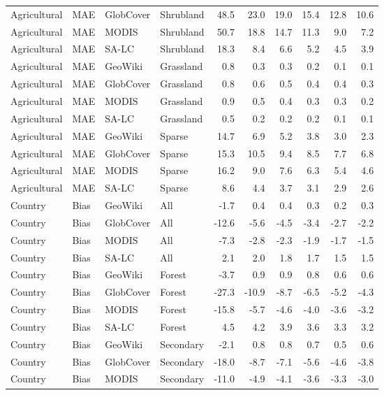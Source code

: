 \begin{longtable}{llllrrrrrr}
  Agricultural & MAE & GlobCover & Shrubland & 48.5 & 23.0 & 19.0 & 15.4 & 12.8 & 10.6 \\ 
  Agricultural & MAE & MODIS & Shrubland & 50.7 & 18.8 & 14.7 & 11.3 & 9.0 & 7.2 \\ 
  Agricultural & MAE & SA-LC & Shrubland & 18.3 & 8.4 & 6.6 & 5.2 & 4.5 & 3.9 \\ 
  Agricultural & MAE & GeoWiki & Grassland & 0.8 & 0.3 & 0.3 & 0.2 & 0.1 & 0.1 \\ 
  Agricultural & MAE & GlobCover & Grassland & 0.8 & 0.6 & 0.5 & 0.4 & 0.4 & 0.3 \\ 
  Agricultural & MAE & MODIS & Grassland & 0.9 & 0.5 & 0.4 & 0.3 & 0.3 & 0.2 \\ 
  Agricultural & MAE & SA-LC & Grassland & 0.5 & 0.2 & 0.2 & 0.2 & 0.1 & 0.1 \\ 
  Agricultural & MAE & GeoWiki & Sparse & 14.7 & 6.9 & 5.2 & 3.8 & 3.0 & 2.3 \\ 
  Agricultural & MAE & GlobCover & Sparse & 15.3 & 10.5 & 9.4 & 8.5 & 7.7 & 6.8 \\ 
  Agricultural & MAE & MODIS & Sparse & 16.2 & 9.0 & 7.6 & 6.3 & 5.4 & 4.6 \\ 
  Agricultural & MAE & SA-LC & Sparse & 8.6 & 4.4 & 3.7 & 3.1 & 2.9 & 2.6 \\ 
  Country & Bias & GeoWiki & All & -1.7 & 0.4 & 0.4 & 0.3 & 0.2 & 0.3 \\ 
  Country & Bias & GlobCover & All & -12.6 & -5.6 & -4.5 & -3.4 & -2.7 & -2.2 \\ 
  Country & Bias & MODIS & All & -7.3 & -2.8 & -2.3 & -1.9 & -1.7 & -1.5 \\ 
  Country & Bias & SA-LC & All & 2.1 & 2.0 & 1.8 & 1.7 & 1.5 & 1.5 \\ 
  Country & Bias & GeoWiki & Forest & -3.7 & 0.9 & 0.9 & 0.8 & 0.6 & 0.6 \\ 
  Country & Bias & GlobCover & Forest & -27.3 & -10.9 & -8.7 & -6.5 & -5.2 & -4.3 \\ 
  Country & Bias & MODIS & Forest & -15.8 & -5.7 & -4.6 & -4.0 & -3.6 & -3.2 \\ 
  Country & Bias & SA-LC & Forest & 4.5 & 4.2 & 3.9 & 3.6 & 3.3 & 3.2 \\ 
  Country & Bias & GeoWiki & Secondary & -2.1 & 0.8 & 0.8 & 0.7 & 0.5 & 0.6 \\ 
  Country & Bias & GlobCover & Secondary & -18.0 & -8.7 & -7.1 & -5.6 & -4.6 & -3.8 \\ 
  Country & Bias & MODIS & Secondary & -11.0 & -4.9 & -4.1 & -3.6 & -3.3 & -3.0 \\ 

\end{longtable}
